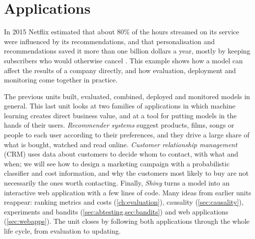 \chapter{Applications}\label{ch:applications}

In 2015 Netflix estimated that about 80\% of the hours streamed on its service were influenced by its
recommendations, and that personalisation and recommendations saved it more than one billion dollars a year, mostly by keeping
subscribers who would otherwise cancel \citep{gomezuribe2015netflix}. This example shows how a model can affect the
results of a company directly, and how evaluation, deployment and monitoring come together in practice.

The previous units built, evaluated, combined, deployed and monitored models in general. This last unit
looks at two families of applications in which machine learning creates direct business value, and at a
tool for putting models in the hands of their users. \emph{Recommender systems} suggest products, films,
songs or people to each user according to their preferences, and they drive a large share of what is
bought, watched and read online. \emph{Customer relationship management} (CRM) uses data about customers to
decide whom to contact, with what and when; we will see how to design a marketing campaign with a
probabilistic classifier and cost information, and why the customers most likely to buy are not
necessarily the ones worth contacting. Finally, \emph{Shiny} turns a model into an interactive web
application with a few lines of code. Many ideas from earlier units reappear: ranking metrics and costs
(\cref{ch:evaluation}), causality (\cref{sec:causality}), experiments and bandits
(\cref{sec:abtesting,sec:bandits}) and web applications (\cref{sec:webapps}). The unit closes by following both applications through the whole life cycle, from evaluation to
updating.

